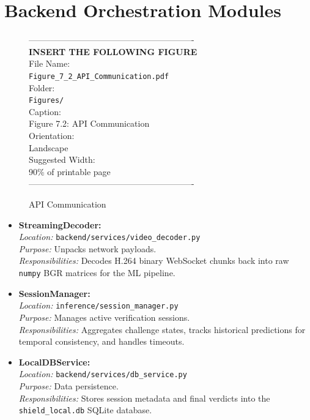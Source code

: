 \section{Backend Orchestration Modules}
\vspace{1em}
\begin{figure}[htbp]
\begin{center}
----------------------------------------------------------\\
\vspace{0.5em}
\textbf{INSERT THE FOLLOWING FIGURE}\\
\vspace{1em}
File Name:\\
\texttt{Figure\_7\_2\_API\_Communication.pdf}\\
\vspace{1em}
Folder:\\
\texttt{Figures/}\\
\vspace{1em}
Caption:\\
Figure 7.2: API Communication\\
\vspace{1em}
Orientation:\\
Landscape\\
\vspace{1em}
Suggested Width:\\
90\% of printable page\\
\vspace{3cm}
----------------------------------------------------------
\end{center}
\caption{API Communication}
\label{fig:diag_13}
\end{figure}
\vspace{1em}
\begin{itemize}
    \item \textbf{StreamingDecoder:} \\
    \textit{Location:} \texttt{backend/services/video\_decoder.py} \\
    \textit{Purpose:} Unpacks network payloads. \\
    \textit{Responsibilities:} Decodes H.264 binary WebSocket chunks back into raw \texttt{numpy} BGR matrices for the ML pipeline.
    
    \item \textbf{SessionManager:} \\
    \textit{Location:} \texttt{inference/session\_manager.py} \\
    \textit{Purpose:} Manages active verification sessions. \\
    \textit{Responsibilities:} Aggregates challenge states, tracks historical predictions for temporal consistency, and handles timeouts.
    
    \item \textbf{LocalDBService:} \\
    \textit{Location:} \texttt{backend/services/db\_service.py} \\
    \textit{Purpose:} Data persistence. \\
    \textit{Responsibilities:} Stores session metadata and final verdicts into the \texttt{shield\_local.db} SQLite database.
\end{itemize}

